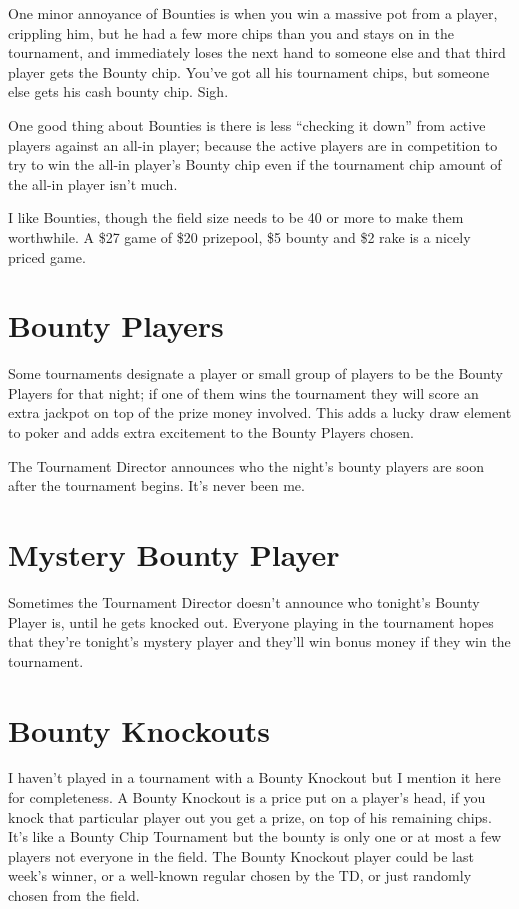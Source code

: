 One minor annoyance of Bounties is when you win a massive pot
from a player, crippling him, but he had a few more chips than
you and stays on in the tournament, and immediately loses the
next hand to someone else and that third player gets the
Bounty chip. You've got all his tournament chips, but someone
else gets his cash bounty chip. Sigh.

One good thing about Bounties is there is less ``checking it down''
from active players against an all-in player; because the active
players are in competition to try to win the all-in player's
Bounty chip even if the tournament chip amount of the all-in player
isn't much.

I like Bounties, though the field size needs to be 40 or more to
make them worthwhile. A \$27 game of \$20 prizepool, \$5 bounty
and \$2 rake is a nicely priced game.

\section{Bounty Players}

Some tournaments designate a player or small group of players
to be the Bounty Players for that night; if one of them wins
the tournament they will score an extra jackpot on top of
the prize money involved. This adds a lucky draw element to
poker and adds extra excitement to the Bounty Players chosen.

The Tournament Director announces who the night's bounty players
are soon after the tournament begins. It's never been me.

\section{Mystery Bounty Player}

Sometimes the Tournament Director doesn't announce who tonight's
Bounty Player is, until he gets knocked out. Everyone playing in the
tournament hopes that they're tonight's mystery player and they'll
win bonus money if they win the tournament.

\section{Bounty Knockouts}

I haven't played in a tournament with a Bounty Knockout but I
mention it here for completeness. A Bounty Knockout is a price
put on a player's head, if you knock that particular player out
you get a prize, on top of his remaining chips. It's like a
Bounty Chip Tournament but the bounty is only one or at most
a few players not everyone in the field. The Bounty Knockout player
could be last week's winner, or a well-known regular chosen
by the TD, or just randomly chosen from the field.

